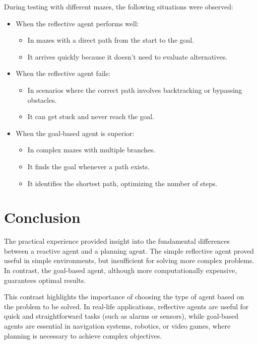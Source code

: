 \documentclass[letterpaper,12pt,oneside]{article}
\begin{document}
During testing with different mazes, the following situations were observed:

\begin{itemize}
    \item When the reflective agent performs well:
    \begin{itemize}
        \item In mazes with a direct path from the start to the goal.
        \item It arrives quickly because it doesn't need to evaluate alternatives.
    \end{itemize}
    \item When the reflective agent fails:
    \begin{itemize}
        \item In scenarios where the correct path involves backtracking or bypassing obstacles.
        \item It can get stuck and never reach the goal.
    \end{itemize}
    \item When the goal-based agent is superior:
    \begin{itemize}
        \item In complex mazes with multiple branches.
        \item It finds the goal whenever a path exists.
        \item It identifies the shortest path, optimizing the number of steps.
    \end{itemize}
\end{itemize}

\section{Conclusion}

The practical experience provided insight into the fundamental differences between a reactive agent and a planning agent. The simple reflective agent proved useful in simple environments, but insufficient for solving more complex problems. In contrast, the goal-based agent, although more computationally expensive, guarantees optimal results.

This contrast highlights the importance of choosing the type of agent based on the problem to be solved. In real-life applications, reflective agents are useful for quick and straightforward tasks (such as alarms or sensors), while goal-based agents are essential in navigation systems, robotics, or video games, where planning is necessary to achieve complex objectives.
\end{document}
